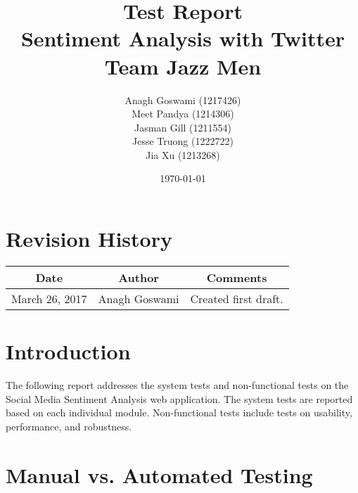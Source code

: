 \documentclass[12pt]{article}
\begin{document}
\title{Test Report\\ Sentiment Analysis with Twitter\\ Team Jazz Men} 
\author{Anagh Goswami (1217426)\\ Meet Pandya (1214306)\\ Jasman Gill 
(1211554)\\ Jesse Truong (1222722)\\ Jia Xu (1213268)}
\date{\today}
  
\maketitle

\pagebreak

\tableofcontents

\section*{Revision History}
\begin{tabular}{|c|c|c|}
\hline
\textbf{Date}  & \textbf{Author} & \textbf{Comments} \\ \hline
March 26, 2017 & Anagh Goswami & Created first draft. \\ 
\hline
\end{tabular}

\pagebreak


\section{Introduction}
The following report addresses the system tests and non-functional tests on the Social Media Sentiment Analysis web application. The system tests are reported based on each individual module. Non-functional tests include tests on usability, performance, and robustness.

\section{Manual vs. Automated Testing}
\end{document}
